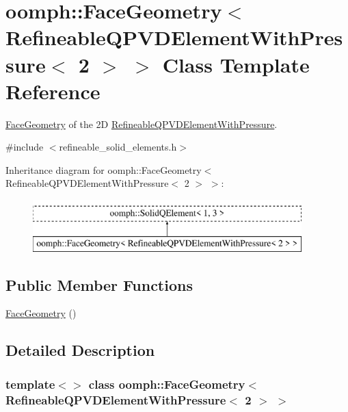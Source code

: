 \hypertarget{classoomph_1_1FaceGeometry_3_01RefineableQPVDElementWithPressure_3_012_01_4_01_4}{}\section{oomph\+:\+:Face\+Geometry$<$ Refineable\+Q\+P\+V\+D\+Element\+With\+Pressure$<$ 2 $>$ $>$ Class Template Reference}
\label{classoomph_1_1FaceGeometry_3_01RefineableQPVDElementWithPressure_3_012_01_4_01_4}


\hyperlink{classoomph_1_1FaceGeometry}{Face\+Geometry} of the 2D \hyperlink{classoomph_1_1RefineableQPVDElementWithPressure}{Refineable\+Q\+P\+V\+D\+Element\+With\+Pressure}.  




{\ttfamily \#include $<$refineable\+\_\+solid\+\_\+elements.\+h$>$}

Inheritance diagram for oomph\+:\+:Face\+Geometry$<$ Refineable\+Q\+P\+V\+D\+Element\+With\+Pressure$<$ 2 $>$ $>$\+:\begin{figure}[H]
\begin{center}
\leavevmode
\includegraphics[height=2.000000cm]{classoomph_1_1FaceGeometry_3_01RefineableQPVDElementWithPressure_3_012_01_4_01_4}
\end{center}
\end{figure}
\subsection*{Public Member Functions}
\begin{DoxyCompactItemize}
\item 
\hyperlink{classoomph_1_1FaceGeometry_3_01RefineableQPVDElementWithPressure_3_012_01_4_01_4_a98c44064e18ca082aa9da029de145dc7}{Face\+Geometry} ()
\end{DoxyCompactItemize}


\subsection{Detailed Description}
\subsubsection*{template$<$$>$\newline
class oomph\+::\+Face\+Geometry$<$ Refineable\+Q\+P\+V\+D\+Element\+With\+Pressure$<$ 2 $>$ $>$}

